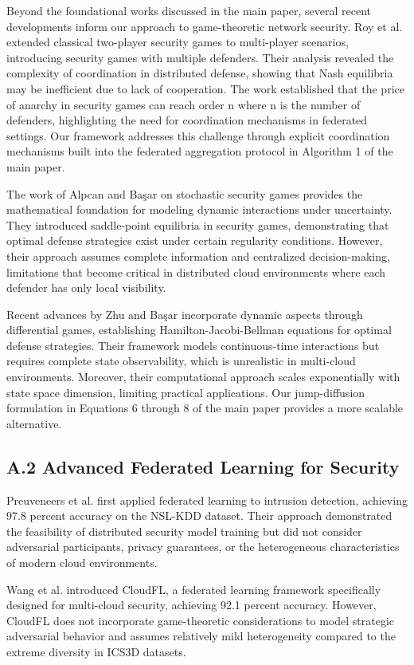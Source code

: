 \documentclass[12pt,a4paper]{article}
\theoremstyle{definition}
\begin{document}
Beyond the foundational works discussed in the main paper, several recent developments inform our approach to game-theoretic network security. Roy et al. extended classical two-player security games to multi-player scenarios, introducing security games with multiple defenders. Their analysis revealed the complexity of coordination in distributed defense, showing that Nash equilibria may be inefficient due to lack of cooperation. The work established that the price of anarchy in security games can reach order n where n is the number of defenders, highlighting the need for coordination mechanisms in federated settings. Our framework addresses this challenge through explicit coordination mechanisms built into the federated aggregation protocol in Algorithm 1 of the main paper.

The work of Alpcan and Başar on stochastic security games provides the mathematical foundation for modeling dynamic interactions under uncertainty. They introduced saddle-point equilibria in security games, demonstrating that optimal defense strategies exist under certain regularity conditions. However, their approach assumes complete information and centralized decision-making, limitations that become critical in distributed cloud environments where each defender has only local visibility.

Recent advances by Zhu and Başar incorporate dynamic aspects through differential games, establishing Hamilton-Jacobi-Bellman equations for optimal defense strategies. Their framework models continuous-time interactions but requires complete state observability, which is unrealistic in multi-cloud environments. Moreover, their computational approach scales exponentially with state space dimension, limiting practical applications. Our jump-diffusion formulation in Equations 6 through 8 of the main paper provides a more scalable alternative.

\subsection{A.2 Advanced Federated Learning for Security}

Preuveneers et al. first applied federated learning to intrusion detection, achieving 97.8 percent accuracy on the NSL-KDD dataset. Their approach demonstrated the feasibility of distributed security model training but did not consider adversarial participants, privacy guarantees, or the heterogeneous characteristics of modern cloud environments.

Wang et al. introduced CloudFL, a federated learning framework specifically designed for multi-cloud security, achieving 92.1 percent accuracy. However, CloudFL does not incorporate game-theoretic considerations to model strategic adversarial behavior and assumes relatively mild heterogeneity compared to the extreme diversity in ICS3D datasets.
\end{document}
